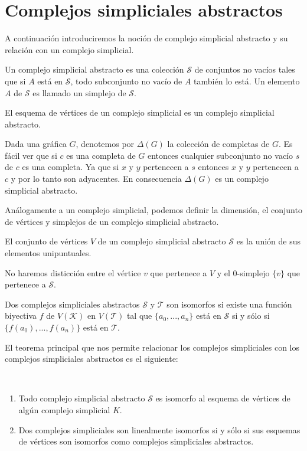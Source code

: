 \section{Complejos simpliciales abstractos}
A continuación introduciremos la noción de complejo simplicial abstracto y su relación con un complejo simplicial.
\begin{Defi}
Un complejo simplicial abstracto es una colección $\mathcal{S}$ de conjuntos no vacíos tales que si $A$ está en $\mathcal{S}$, todo subconjunto no vacío de $A$ también lo está. Un elemento $\textit{A}$ de $\mathcal{S}$ es llamado un simplejo de $\mathcal{S}$. 
\end{Defi}
\begin{Ejem}
El esquema de vértices de un complejo simplicial es un complejo simplicial abstracto.
\end{Ejem}
\begin{Ejem}
Dada una gráfica $G$, denotemos por $\Delta(G)$ la colección de completas de $G$. Es fácil ver que si $c$ es una completa de $G$ entonces cualquier subconjunto no vacío $s$ de $c$ es una completa. Ya que si $x$ y $y$ pertenecen a $s$ entonces $x$ y $y$ pertenecen a $c$ y por lo tanto son adyacentes. En consecuencia $\Delta(G)$ es un complejo simplicial abstracto.
\end{Ejem}
Análogamente a un complejo simplicial, podemos definir la dimensión, el conjunto de vértices y simplejos de un complejo simplicial abstracto.
\begin{Defi}
El conjunto de vértices $V$ de un complejo simplicial abstracto $\mathcal{S}$ es la unión de sus elementos unipuntuales.
\end{Defi}
No haremos disticción entre el vértice $v$ que pertenece a $V$ y el 0-simplejo $\{v\}$ que pertenece a $\mathcal{S}$.
\begin{Defi}
Dos complejos simpliciales abstractos $\mathcal{S}$ y $\mathcal{T}$ son isomorfos si existe una función biyectiva $f$ de $V(\mathcal{K})$ en $V(\mathcal{T})$ tal que $\{a_0,...,a_n\}$ está en $\mathcal{S}$ si y sólo si $\{f(a_0),...,f(a_n)\}$ está en $\mathcal{T}$.
\end{Defi}
El teorema principal que nos permite relacionar los complejos simpliciales con los complejos simpliciales abstractos es el siguiente:
\begin{Teo}\label{tpc} 
~\begin{enumerate}
\item Todo complejo simplicial abstracto $\mathcal{S}$ es isomorfo al esquema de vértices de algún complejo simplicial $K$.
\item Dos complejos simpliciales son linealmente isomorfos si y sólo si sus esquemas de vértices son isomorfos como complejos simpliciales abstractos.
\end{enumerate}
\end{Teo}

